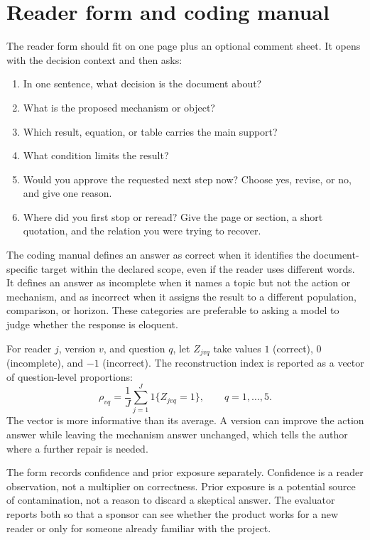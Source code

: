 \section{Reader form and coding manual}
\label{sec:manual-reader-form}

The reader form should fit on one page plus an optional comment sheet. It opens
with the decision context and then asks:

\begin{enumerate}
\item In one sentence, what decision is the document about?
\item What is the proposed mechanism or object?
\item Which result, equation, or table carries the main support?
\item What condition limits the result?
\item Would you approve the requested next step now? Choose yes, revise, or
      no, and give one reason.
\item Where did you first stop or reread? Give the page or section, a short
      quotation, and the relation you were trying to recover.
\end{enumerate}

The coding manual defines an answer as correct when it identifies the
document-specific target within the declared scope, even if the reader uses
different words. It defines an answer as incomplete when it names a topic but
not the action or mechanism, and as incorrect when it assigns the result to a
different population, comparison, or horizon. These categories are preferable
to asking a model to judge whether the response is eloquent.

For reader $j$, version $v$, and question $q$, let $Z_{jvq}$ take values
$1$ (correct), $0$ (incomplete), and $-1$ (incorrect). The reconstruction index
is reported as a vector of question-level proportions:
\begin{equation}
  \rho_{vq} = \frac{1}{J}\sum_{j=1}^{J}1\{Z_{jvq}=1\},
  \qquad q=1,\ldots,5.
  \label{eq:manual-reader-coding}
\end{equation}
The vector is more informative than its average. A version can improve the
action answer while leaving the mechanism answer unchanged, which tells the
author where a further repair is needed.

The form records confidence and prior exposure separately. Confidence is a
reader observation, not a multiplier on correctness. Prior exposure is a
potential source of contamination, not a reason to discard a skeptical answer.
The evaluator reports both so that a sponsor can see whether the product works
for a new reader or only for someone already familiar with the project.

